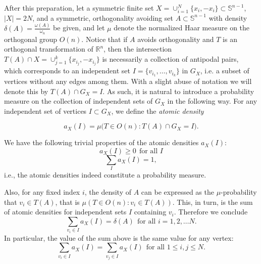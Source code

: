 \documentclass[11pt]{amsart}
\numberwithin{equation}{section}
\newcommand{\Sp}{\mathbb S}
\newcommand{\R}{\mathbb R}
\begin{document}
\medskip

After this preparation, let a symmetric finite set $X=\cup_{i=1}^N \{x_i, -x_i\}\subset \Sp^{n-1}$, $|X|=2N$, and a symmetric, orthogonality avoiding set $A\subset \Sp^{n-1}$ with density $\delta(A)=\frac{\omega(A)}{\omega_n}$ be given, and let $\mu$ denote the normalized Haar measure on the orthogonal group $O(n)$. Notice that if $A$ avoids orthogonality and $T$ is an orthogonal transformation of $\R^n$, then the intersection $T(A)\cap X=\cup_{j=1}^k \{ x_{i_j}, -x_{i_j} \}$ is necessarily a collection of antipodal pairs, which corresponds to an independent set $I=\{v_{i_1}, \dots, v_{i_k}\}$ in $G_X$, i.e. a subset of vertices without any edges among them. With a slight abuse of notation we will denote this by $T(A)\cap G_X=I$. As such, it is natural to introduce a probability measure on the collection of independent sets of $G_X$ in the following way. For any independent set of vertices $I\subset G_X$, we define the {\it atomic density}

\begin{equation}\label{ax}
a_X(I)= \mu\Big (T\in O(n): T(A)\cap G_X=I\Big ).    
\end{equation}

We have the following trivial properties of the atomic densities $a_X(I)$: 
\begin{equation}\label{iep}
a_X(I) \ge 0 \ \ {\textrm{for all \ }} I    
\end{equation}
\begin{equation}\label{iet}
\sum_I a_X(I)= 1,    
\end{equation}
i.e., the atomic densities indeed constitute a probability measure. 

\medskip

Also, for any fixed index $i$, the density of $A$ can be expressed as the $\mu$-probability that $v_i\in T(A)$, that is $\mu(T\in O(n):v_i\in T(A))$. This, in turn, is the sum of atomic densities for independent sets $I$ containing $v_i$. Therefore we conclude  
\begin{equation}\label{ie1}
\sum_{v_i\in I} a_X(I)= \delta(A) \ \ {\textrm{for all \ }} i=1, 2, \dots N.    
\end{equation}
In particular, the value of the sum above is the same value for any vertex: 
\begin{equation}\label{ie1b}
\sum_{v_i\in I} a_X(I)= \sum_{v_j\in I} a_X(I) \ \ {\textrm{for all \ }} 1\le i, j\le N.    
\end{equation}
\end{document}
